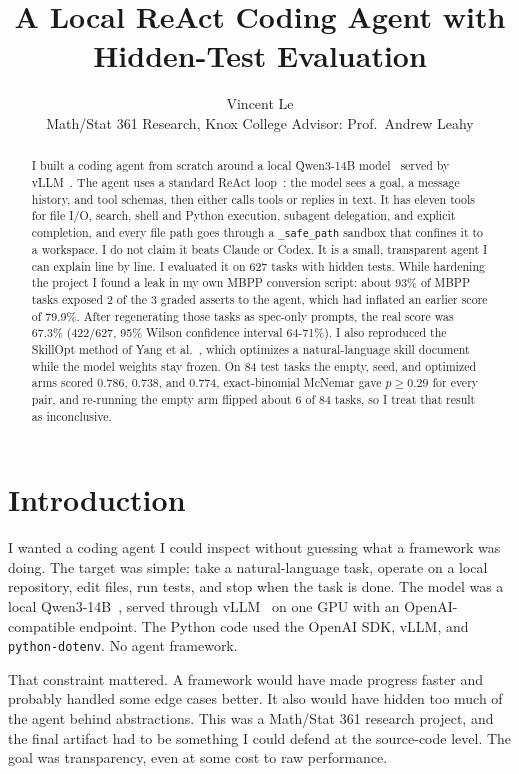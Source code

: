 \documentclass[11pt]{article}
\title{\vspace{-1.6em}A Local ReAct Coding Agent with Hidden-Test Evaluation}
\author{Vincent Le\\[-0.2em]
\small Math/Stat 361 Research, Knox College \quad\textbar\quad Advisor: Prof.\ Andrew Leahy}
\date{}
\newcommand{\code}[1]{\texttt{\small #1}}
\begin{document}
\maketitle
\vspace{-2.2em}

\begin{abstract}
\noindent
I built a coding agent from scratch around a local Qwen3-14B model~\cite{qwen3} served by
vLLM~\cite{vllm}. The agent uses a standard ReAct loop~\cite{react}: the model sees a goal, a message
history, and tool schemas, then either calls tools or replies in text. It has eleven tools for file
I/O, search, shell and Python execution, subagent delegation, and explicit completion, and every file
path goes through a \code{\_safe\_path} sandbox that confines it to a workspace. I do not claim it beats
Claude or Codex. It is a small, transparent agent I can explain line by line. I evaluated it on 627
tasks with hidden tests. While hardening the project I found a leak in my own MBPP conversion script:
about 93\% of MBPP tasks exposed 2 of the 3 graded asserts to the agent, which had inflated an earlier
score of 79.9\%. After regenerating those tasks as spec-only prompts, the real score was 67.3\%
(422/627, 95\% Wilson confidence interval 64-71\%). I also reproduced the SkillOpt method of Yang et
al.~\cite{skillopt}, which optimizes a natural-language skill document while the model weights stay
frozen. On 84 test tasks the empty, seed, and optimized arms scored 0.786, 0.738, and 0.774,
exact-binomial McNemar gave $p \ge 0.29$ for every pair, and re-running the empty arm flipped about 6
of 84 tasks, so I treat that result as inconclusive.
\end{abstract}

\section{Introduction}
I wanted a coding agent I could inspect without guessing what a framework was doing. The target was
simple: take a natural-language task, operate on a local repository, edit files, run tests, and stop when
the task is done. The model was a local Qwen3-14B~\cite{qwen3}, served through vLLM~\cite{vllm} on one
GPU with an OpenAI-compatible endpoint. The Python code used the OpenAI SDK, vLLM, and
\code{python-dotenv}. No agent framework.

That constraint mattered. A framework would have made progress faster and probably handled some edge
cases better. It also would have hidden too much of the agent behind abstractions. This was a Math/Stat
361 research project, and the final artifact had to be something I could defend at the source-code level.
The goal was transparency, even at some cost to raw performance.
\end{document}
